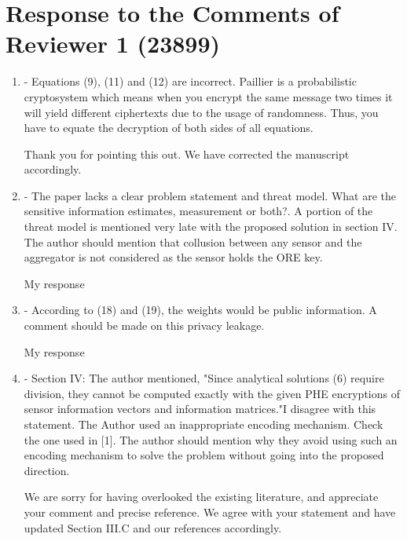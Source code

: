 \documentclass[a4paper]{scrartcl}
\newenvironment{rebuttal}{\begin{enumerate}[label={\color{grey}\thesection.\arabic{enumi}},leftmargin=0pt,ref=\thesection.\arabic{enumi}]}{\end{enumerate}}
\newcommand{\reviewtext}[1]{{\color{nblue} #1}}
\begin{document}



\section*{Response to the Comments of Reviewer 1 (23899)}
\def\thesection{R1}
\begin{rebuttal}
\item \reviewtext{- Equations (9), (11) and (12) are incorrect. Paillier is a
probabilistic cryptosystem which means when you encrypt the same
message two times it will yield different ciphertexts due to the usage
of randomness. Thus, you have to equate the decryption of both sides of
all equations. }

Thank you for pointing this out. We have corrected the manuscript accordingly.

\item \reviewtext{- The paper lacks a clear problem statement and threat model. What are
the sensitive information estimates, measurement or both?. A portion of
the threat model is mentioned very late with the proposed solution in
section IV. The author should mention that collusion between any sensor
and the aggregator is not considered as the sensor holds the ORE key. }

My response

\item \reviewtext{- According to (18) and (19), the weights would be public information.
A comment should be made on this privacy leakage.}

My response

\item \reviewtext{- Section IV: The author mentioned, "Since analytical solutions (6)
require division, they cannot be computed exactly with the given PHE
encryptions of sensor information vectors and information matrices."I
disagree with this statement. The Author used an inappropriate encoding
mechanism. Check the one used in [1]. The author should mention why
they avoid using such an encoding mechanism to solve the problem
without going into the proposed direction. }

We are sorry for having overlooked the existing literature, and appreciate your comment and precise reference. We agree with your statement and have updated Section III.C and our references accordingly.


\end{rebuttal}
\end{document}

